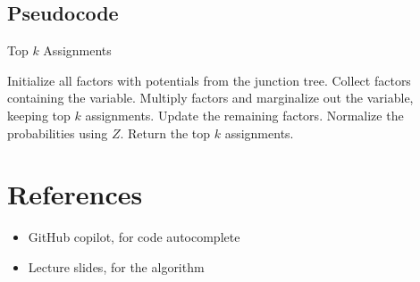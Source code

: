 \documentclass{article}
\begin{document}
\subsection{Pseudocode}
\begin{algorithm}[H]
\caption{Top \( k \) Assignments}
\begin{algorithmic}[1]
\State Initialize all factors with potentials from the junction tree.
    \State Collect factors containing the variable.
    \State Multiply factors and marginalize out the variable, keeping top \( k \) assignments.
    \State Update the remaining factors.
\EndFor
\State Normalize the probabilities using \( Z \).
\State Return the top \( k \) assignments.
\end{algorithmic}
\end{algorithm}

\section{References}
\begin{itemize}
    \item GitHub copilot, for code autocomplete
    \item Lecture slides, for the algorithm
\end{itemize}
\end{document}
